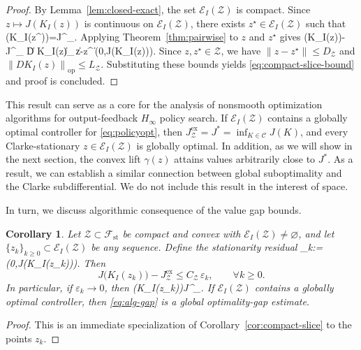 \documentclass[letterpaper,10pt,conference]{ieeeconf}
\def\[#1\]{\begin{align*}#1\end{align*}}
\providecommand{\cC}{\mathcal{C}}
\providecommand{\cF}{\mathcal{F}}
\providecommand{\cE}{\mathcal{E}}
\providecommand{\cZ}{\mathcal{Z}}
\providecommand{\distop}{\operatorname{dist}}
\providecommand{\opnorm}[1]{\left\|#1\right\|_{\mathrm{op}}}
\renewcommand{\^}[1]{^{(#1)}}
\newtheorem{corollary}[theorem]{Corollary}
\begin{document}
\begin{proof}
By Lemma~\ref{lem:closed-exact}, the set $\cE_I(\cZ)$ is compact. Since $z\mapsto J(K_I(z))$ is continuous on $\cE_I(\cZ)$, there exists $z^\star\in\cE_I(\cZ)$ such that
\[
J\bigl(K_I(z^\star)\bigr)=J^{}_{\cZ}.
\]
Applying Theorem~\ref{thm:pairwise} to $z$ and $z^\star$ gives
\[
J\bigl(K_I(z)\bigr)-J^{}_{\cZ}
\le
\opnorm{D K_I(z)}\,\|z-z^\star\|\,\distop\!\bigl(0,\partial J(K_I(z))\bigr).
\]
Since $z,z^\star\in\cZ$, we have $\|z-z^\star\|\le D_{\cZ}$ and $\opnorm{D K_I(z)}\le L_{\cZ}$. Substituting these bounds yields \eqref{eq:compact-slice-bound} and proof is concluded.
\end{proof}

This result can serve as a core for the analysis of nonsmooth optimization algorithms for output-feedback $H_\infty$ policy search. If $\cE_I(\cZ)$ contains a globally optimal controller for \eqref{eq:policyopt}, then $J^{\mathrm{ex}}_{\cZ}=J^*=\inf_{K\in\cC}J(K)$, and every Clarke-stationary $z\in\cE_I(\cZ)$ is globally optimal. In addition, as we will show in the next section, the convex lift $\gamma(z)$ attains values arbitrarily close to $J^*$. As a result, we can establish a similar connection between global suboptimality and the Clarke subdifferential. We do not include this result in the interest of space.





In turn, we discuss algorithmic consequence of the value gap bounds.

\begin{corollary}\label{cor:algorithmic}
Let $\cZ\subset\cF_{\mathrm{st}}$ be compact and convex with $\cE_I(\cZ)\neq\varnothing$, and let $\{z_k\}_{k\ge 0}\subset \cE_I(\cZ)$ be any sequence. Define the stationarity residual
\[
\varepsilon_k:=\distop\!\bigl(0,\partial J(K_I(z_k))\bigr).
\]
Then
\begin{equation}\label{eq:alg-gap}
J\bigl(K_I(z_k)\bigr)-J^{\mathrm{ex}}_{\cZ}
\le C_{\cZ}\,\varepsilon_k,
\qquad \forall k\ge 0.
\end{equation}
In particular, if $\varepsilon_k\to 0$, then
\[
J\bigl(K_I(z_k)\bigr)\to J^{}_{\cZ}.
\]
If $\cE_I(\cZ)$ contains a globally optimal controller, then \eqref{eq:alg-gap} is a global optimality-gap estimate.
\end{corollary}

\begin{proof}
This is an immediate specialization of Corollary~\ref{cor:compact-slice} to the points $z_k$.
\end{proof}
\end{document}
